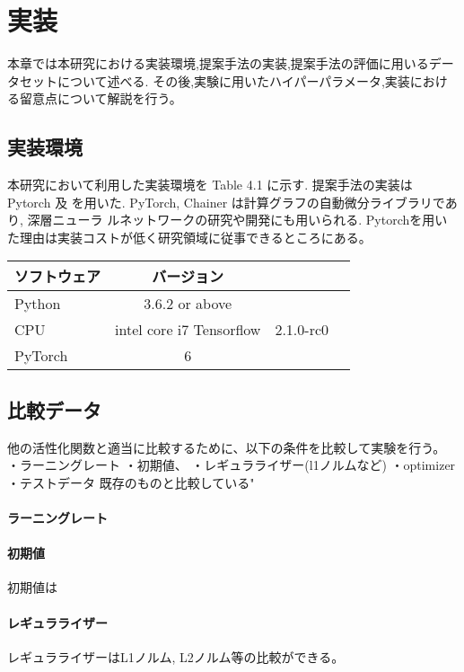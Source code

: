\chapter{実装}
\label{implementation}

本章では本研究における実装環境,提案手法の実装,提案手法の評価に用いるデータセットについて述べる.
その後,実験に用いたハイパーパラメータ,実装における留意点について解説を行う。


\section{実装環境}



本研究において利用した実装環境を Table 4.1 に示す. 提案手法の実装は Pytorch 及
を用いた.  PyTorch, Chainer は計算グラフの自動微分ライブラリであり, 深層ニューラ
ルネットワークの研究や開発にも用いられる.
Pytorchを用いた理由は実装コストが低く研究領域に従事できるところにある。



\begin{tabular}{l*{2}{c}r}
ソフトウェア              & バージョン \\
\hline
Python            & 3.6.2 or above \\
CPU               & intel core i7
Tensorflow        & 2.1.0-rc0 \\
PyTorch           & 6 \\
\end{tabular}





\section{比較データ}

他の活性化関数と適当に比較するために、以下の条件を比較して実験を行う。
・ラーニングレート
・初期値、
・レギュラライザー(l1ノルムなど)
・optimizer
・テストデータ
既存のものと比較している"
\subsubsection{ラーニングレート}

\subsubsection{初期値}
初期値は
\subsubsection{レギュラライザー}
レギュラライザーはL1ノルム, L2ノルム等の比較ができる。
